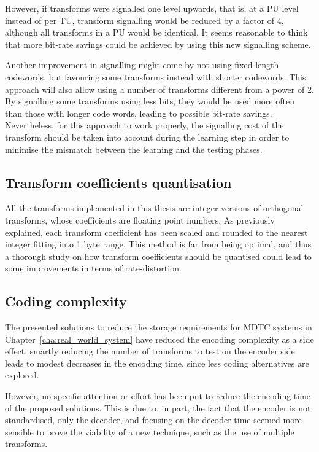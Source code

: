 \documentclass[11pt,a4paper,openright,twoside]{book}
\numberwithin{equation}{section} %
\numberwithin{figure}{section} %
\numberwithin{table}{section} %
\begin{document}
However, if transforms were signalled one level upwards, that is, at a \ac{PU}
level instead of per \ac{TU}, transform signalling would be reduced by a
factor of 4, although all transforms in a \ac{PU} would be identical.
It seems reasonable to think that more bit-rate savings could be achieved by
using this new signalling scheme.

Another improvement in signalling might come by not using fixed length
codewords, but favouring some transforms instead with shorter codewords.
This approach will also allow using a number of transforms different from a
power of 2.
By signalling some transforms using less bits, they would be used more often
than those with longer code words, leading to possible bit-rate savings.
Nevertheless, for this approach to work properly, the signalling cost of the
transform should be taken into account during the learning step in order to
minimise the mismatch between the learning and the testing phases.

\subsection*{Transform coefficients quantisation}
\label{sub:transform_coefficients_quantisation}

All the transforms implemented in this thesis are integer versions of
orthogonal transforms, whose coefficients are floating point numbers.
As previously explained, each transform coefficient has been scaled and
rounded to the nearest integer fitting into 1 byte range.
This method is far from being optimal, and thus a thorough study on how
transform coefficients should be quantised could lead to some improvements in
terms of rate-distortion.

\subsection*{Coding complexity}
\label{sub:coding_complexity}

The presented solutions to reduce the storage requirements for \ac{MDTC}
systems in Chapter~\ref{cha:real_world_system} have reduced the encoding
complexity as a side effect:
smartly reducing the number of transforms to test on the encoder side leads to
modest decreases in the encoding time, since less coding alternatives are
explored.

However, no specific attention or effort has been put to reduce the encoding
time of the proposed solutions.
This is due to, in part, the fact that the encoder is not standardised, only
the decoder, and focusing on the decoder time seemed more sensible to prove
the viability of a new technique, such as the use of multiple transforms.
\end{document}
